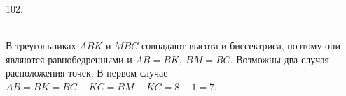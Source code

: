 \documentclass[12pt]{article}
\begin{document}
102. \begin{figure}[ht!]
\end{figure}\\
В треугольниках $ABK$ и $MBC$ совпадают высота и биссектриса, поэтому они являются равнобедренными и $AB=BK,\ BM=BC.$ Возможны два случая расположения точек. В первом случае $AB=BK=BC-KC=BM-KC=8-1=7.$
 \begin{figure}[ht!]
\end{figure}\\
\end{document}
